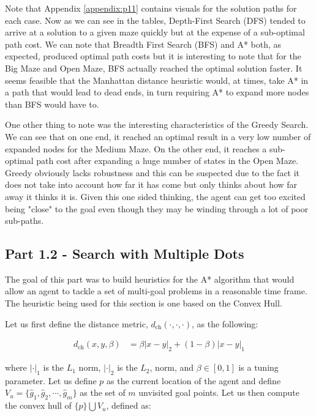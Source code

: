 \documentclass{article}[12pt]
\begin{document}
   Note that Appendix \ref{appendix:p11} contains visuals for the solution paths for each case. Now as we can see in the tables, Depth-First Search (DFS) tended to arrive at a solution to a given maze quickly but at the expense of a sub-optimal path cost. We can note that Breadth First Search (BFS) and A* both, as expected, produced optimal path costs but it is interesting to note that for the Big Maze and Open Maze, BFS actually reached the optimal solution faster. It seems feasible that the Manhattan distance heuristic would, at times, take A* in a path that would lead to dead ends, in turn requiring A* to expand more nodes than BFS would have to. 
   
   One other thing to note was the interesting characteristics of the Greedy Search. We can see that on one end, it reached an optimal result in a very low number of expanded nodes for the Medium Maze. On the other end, it reaches a sub-optimal path cost after expanding a huge number of states in the Open Maze. Greedy obviously lacks robustness and this can be suspected due to the fact it does not take into account how far it has come but only thinks about how far away it thinks it is. Given this one sided thinking, the agent can get too excited being "close" to the goal even though they may be winding through a lot of poor sub-paths.
   
    
   
    \newpage
   \subsection{Part 1.2 - Search with Multiple Dots}
The goal of this part was to build heuristics for the A* algorithm that would allow an agent to tackle a set of multi-goal problems in a reasonable time frame. The heuristic being used for this section is one based on the Convex Hull. 

Let us first define the distance metric, $d_{\text{ch}}(\cdot,\cdot,\cdot)$, as the following:

\begin{align*}
d_{\text{ch}}(x,y, \beta) &= \beta |x-y|_2+ \left(1-\beta\right) |x-y|_1 
\end{align*}

where $|\cdot|_1$ is the $L_1$ norm, $|\cdot|_2$ is the $L_2$, norm, and $\beta \in [0,1]$ is a tuning parameter. Let us define $p$ as the current location of the agent and define $V_u = \lbrace \hat{g}_1, \hat{g}_2, \cdots, \hat{g}_m \rbrace$ as the set of $m$ unvisited goal points. Let us then compute the convex hull of $\lbrace p \rbrace \bigcup V_u$, defined as:
\end{document}

